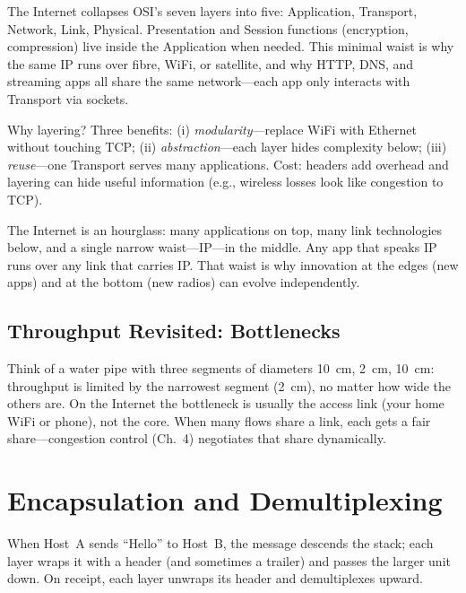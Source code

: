 The Internet collapses OSI's seven layers into five: Application, Transport, Network, Link, Physical. Presentation and Session functions (encryption, compression) live inside the Application when needed. This minimal waist is why the same IP runs over fibre, WiFi, or satellite, and why HTTP, DNS, and streaming apps all share the same network---each app only interacts with Transport via sockets.

Why layering? Three benefits: (i) \emph{modularity}---replace WiFi with Ethernet without touching TCP; (ii) \emph{abstraction}---each layer hides complexity below; (iii) \emph{reuse}---one Transport serves many applications. Cost: headers add overhead and layering can hide useful information (e.g., wireless losses look like congestion to TCP).

\begin{remark}
The Internet is an hourglass: many applications on top, many link technologies below, and a single narrow waist---IP---in the middle. Any app that speaks IP runs over any link that carries IP. That waist is why innovation at the edges (new apps) and at the bottom (new radios) can evolve independently.
\end{remark}

\subsection{Throughput Revisited: Bottlenecks}
Think of a water pipe with three segments of diameters 10~cm, 2~cm, 10~cm: throughput is limited by the narrowest segment (2~cm), no matter how wide the others are. On the Internet the bottleneck is usually the access link (your home WiFi or phone), not the core. When many flows share a link, each gets a fair share---congestion control (Ch.~4) negotiates that share dynamically.

\section{Encapsulation and Demultiplexing}
\label{sec:encapsulation}
When Host~A sends ``Hello'' to Host~B, the message descends the stack; each layer wraps it with a header (and sometimes a trailer) and passes the larger unit down. On receipt, each layer unwraps its header and demultiplexes upward.

